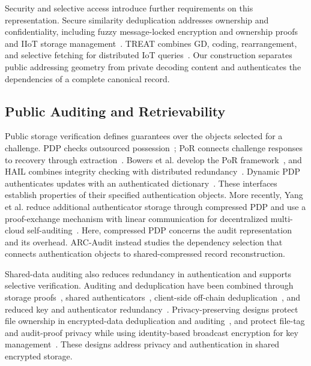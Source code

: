 \documentclass[10pt,journal]{IEEEtran}
\begin{document}
Security and selective access introduce further requirements on this
representation. Secure similarity deduplication addresses ownership and confidentiality,
including fuzzy message-locked encryption and ownership
proofs~\cite{Jiang2023FuzzyDedup} and IIoT storage management~\cite{Gao2024}.
TREAT combines GD, coding, rearrangement, and selective fetching for
distributed IoT queries~\cite{Taurone2024TREAT}. Our construction separates
public addressing geometry from private decoding content and authenticates
the dependencies of a complete canonical record.

\subsection{Public Auditing and Retrievability}
Public storage verification defines guarantees over the objects selected
for a challenge. PDP checks outsourced possession~\cite{Ateniese2007PDP}; PoR connects
challenge responses to recovery through extraction~\cite{Juels2007POR,ShachamWaters2013}.
Bowers et al. develop the PoR framework~\cite{Bowers2009PORTheory}, and
HAIL combines integrity checking with distributed redundancy~\cite{Bowers2009HAIL}.
Dynamic PDP authenticates updates with an authenticated
dictionary~\cite{Erway2009DPDP}. These interfaces establish properties of
their specified authentication objects. More recently, Yang et al. reduce
additional authenticator storage through compressed PDP and use a proof-exchange
mechanism with linear communication for decentralized multi-cloud
self-auditing~\cite{Yang2025CompressedPDP}. Here, compressed PDP concerns
the audit representation and its overhead. ARC-Audit instead studies the
dependency selection that connects authentication objects to shared-compressed
record reconstruction.

Shared-data auditing also reduces redundancy in authentication and
supports selective verification. Auditing and deduplication have been combined through storage
proofs~\cite{Zheng2012POSD}, shared authenticators~\cite{Tian2022SharedAudit},
client-side off-chain deduplication~\cite{Zhang2023BlockchainAudit}, and
reduced key and authenticator redundancy~\cite{Miao2024SharedAudit}.
Privacy-preserving designs protect file ownership in encrypted-data
deduplication and auditing~\cite{Song2023EncryptedAudit}, and protect file-tag
and audit-proof privacy while using identity-based broadcast encryption for
key management~\cite{Zhang2025PrivacyAudit}. These designs address privacy
and authentication in shared encrypted storage.
\end{document}
